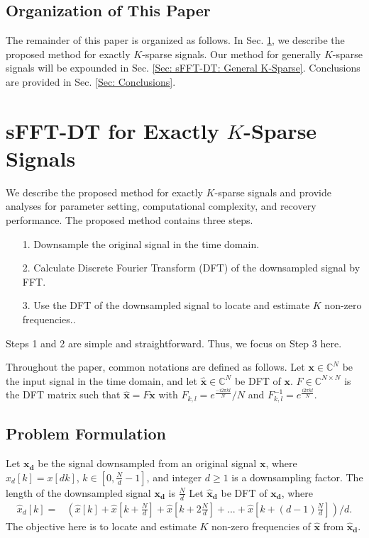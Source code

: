 \documentclass[journal,onecolumn,11pt]{IEEEtran}
\begin{document}
\subsection{Organization of This Paper}
The remainder of this paper is organized as follows.
In Sec. \ref{Sec: sFFT-DT: Exact K-Sparse}, we describe the proposed method for exactly $K$-sparse signals.
Our method for generally $K$-sparse signals will be expounded in Sec. \ref{Sec: sFFT-DT: General K-Sparse}.
Conclusions are provided in Sec. \ref{Sec: Conclusions}.



\section{sFFT-DT for Exactly $K$-Sparse Signals}\label{Sec: sFFT-DT: Exact K-Sparse}
We describe the proposed method for exactly $K$-sparse signals and provide analyses for parameter setting, computational complexity, and recovery performance.
The proposed method contains three steps.
\begin{itemize}
  \item[1.] Downsample the original signal in the time domain.
  \item[2.] Calculate Discrete Fourier Transform (DFT) of the downsampled signal by FFT.
  \item[3.] Use the DFT of the downsampled signal to locate and estimate $K$ non-zero frequencies..
\end{itemize}
Steps 1 and 2 are simple and straightforward.
Thus, we focus on Step 3 here.

Throughout the paper, common notations are defined as follows.
Let $\bm{x}\in \mathbb{C}^{N}$ be the input signal in the time domain, and let $\hat{\bm{x}} \in \mathbb{C}^{N} $ be DFT of $\bm{x}$.
$F\in \mathbb{C}^{N\times N}$ is the DFT matrix such that $\hat{\bm{x}}=F\bm{x}$ with $F_{k,l}=e^{\frac{-i2\pi kl}{N}}/N$ and $F_{k,l}^{-1}=e^{\frac{i2\pi kl}{N}}$.

\subsection{Problem Formulation}\label{ssec:DFT Property}
Let $\bm{x_{d}}$ be the signal downsampled from an original signal $\bm{x}$, where $x_{d}[k]=x[dk]$, $k\in [0,\frac{N}{d}-1]$, and integer $d\geq 1$  is a downsampling factor.
The length of the downsampled signal $\bm{x_{d}}$ is $\frac{N}{d}$
Let $\bm{\hat{x}_{d}}$ be DFT of $\bm{x_{d}}$, where
\small
\begin{equation}
\begin{aligned}
	  \hat{x}_{d}[k]=&(\hat{x}[k]+\hat{x}[k+\frac{N}{d}]+\hat{x}[k+2\frac{N}{d}]+...+\hat{x}[k+(d-1)\frac{N}{d}])/d.
\end{aligned}
\label{eq:xd}
\end{equation}
\normalsize
The objective here is to locate and estimate $K$ non-zero frequencies of $\bm{\hat{x}}$ from $\bm{\hat{x}_{d}}$.
\end{document}
